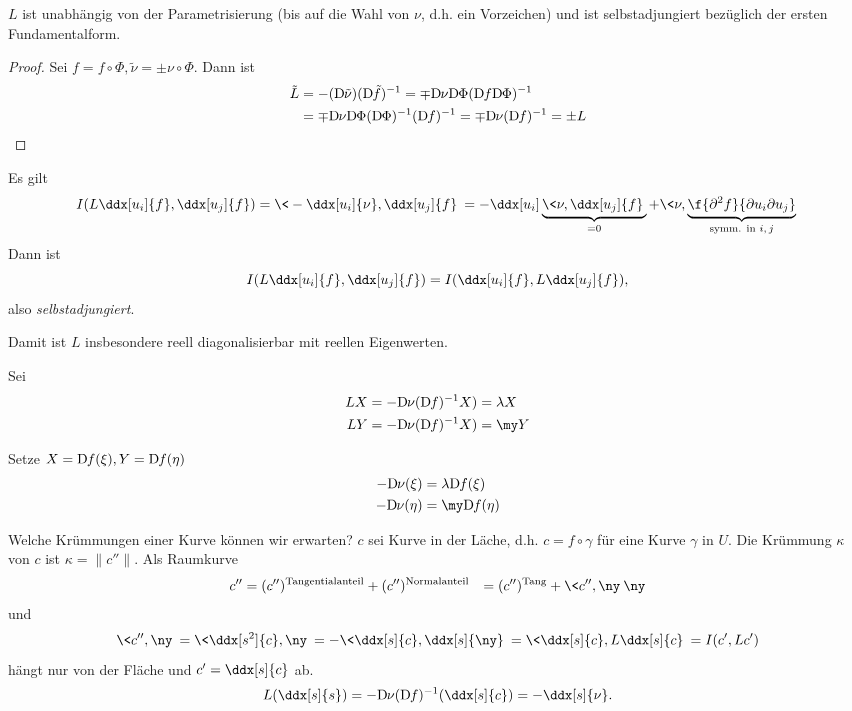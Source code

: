 \begin{lem}
	$L$ ist unabhängig von der Parametrisierung (bis auf die Wahl von $\nu$, d.h. ein Vorzeichen) und ist selbstadjungiert bezüglich der ersten Fundamentalform.
	\begin{proof}
		Sei $f = f \circ \Phi, \tilde \nu = \pm \nu \circ \Phi$.
		Dann ist
		\begin{align*}
			\tilde L
			&= -(\Df[\tilde \nu]) (\Df[\tilde f])^{-1}
			= \mp \Df[\nu] \Df[\Phi] (\Df \Df[\Phi])^{-1} \\
			&= \mp \Df[\nu] \Df[\Phi] (\Df[\Phi])^{-1} (\Df)^{-1}
			= \mp \Df[\nu] (\Df)^{-1}
			= \pm L
		\end{align*}
	\end{proof}
	Es gilt
	\[
		I(L \ddx[u_i]{f}, \ddx[u_j]{f})
		= \< - \ddx[u_i]{\nu}, \ddx[u_j]{f} \>
		= - \ddx[u_i]\underbrace{\<\nu, \ddx[u_j]{f}\>}_{=0} + \<\nu, \underbrace{\f{\partial^2 f}{\partial u_i \partial u_j}}_{\text{symm. in $i,j$}} \>
	\]
	Dann ist
	\[
		I(L \ddx[u_i]{f}, \ddx[u_j]{f})
		= I(\ddx[u_i]{f}, L \ddx[u_j]{f}),
	\]
	also \emph{selbstadjungiert}.
	\begin{note}
		Damit ist $L$ insbesondere reell diagonalisierbar mit reellen Eigenwerten.
	\end{note}
\end{lem}



Sei
\begin{align*}
	LX &= -\Df[\nu](\Df)^{-1}X) = \lambda X \\
	LY &= -\Df[\nu](\Df)^{-1}X) = \my Y
\end{align*}

Setze $X = \Df(\xi), Y = \Df(\eta)$
\begin{align*}
	-\Df[\nu](\xi) &= \lambda \Df(\xi) \\
	-\Df[\nu](\eta) &= \my \Df(\eta)
\end{align*}

Welche Krümmungen einer Kurve können wir erwarten?
$c$ sei Kurve in der Läche, d.h. $c = f \circ \gamma$ für eine Kurve $\gamma$ in $U$.
Die Krümmung $\kappa$ von $c$ ist $\kappa = \|c''\|$.
Als Raumkurve
\begin{align*}
	c'' &= (c'')^{\text{Tangentialanteil}} + (c'')^{\text{Normalanteil}}
	&= (c'')^{\text{Tang}} +\<c'', \ny\> \ny
\end{align*}
und
\[
	\<c'', \ny\> = \<\ddx[s^2]{c}, \ny\> = -\<\ddx[s]{c}, \ddx[s]{\ny} \> = \<\ddx[s]{c}, L \ddx[s]{c}\>
	= I(c', Lc')
\]
hängt nur von der Fläche und $c' = \ddx[s]{c}$ ab.
\[
	L(\ddx[s]{s}) = -\Df[\nu](\Df)^{-1}(\ddx[s]{c}) = - \ddx[s]{\nu}.
\]

